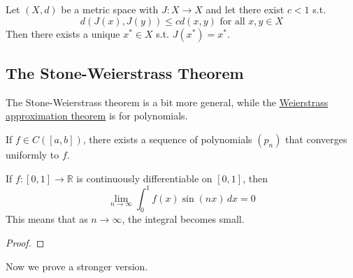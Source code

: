   \begin{theorem}
    \label{thm:contraction-mapping-theorem}
    Let $(X, d)$ be a metric space with $J: X \to X$ and let there exist $c < 1$ s.t.  
    \begin{equation}
      d(J(x), J(y)) \leq c d(x, y) \text{ for all } x, y \in X
    \end{equation}
    Then there exists a unique $x^\ast \in X$ s.t. $J(x^\ast) = x^\ast$. 
  \end{theorem}

\subsection{The Stone-Weierstrass Theorem} 

  The Stone-Weierstrass theorem is a bit more general, while the \hyperref[thm:weierstrass-approximation-theorem]{Weierstrass approximation theorem} is for polynomials. 

  \begin{theorem}
    \label{thm:weierstrass-approximation-theorem}
    If $f \in C([a, b])$, there exists a sequence of polynomials $(p_n)$ that converges uniformly to $f$. 
  \end{theorem}

  \begin{lemma}
    \label{thm:continuously-differentiable-means-integral}
 
    If $f: [0, 1] \to \mathbb{R}$ is continuously differentiable on $[0, 1]$, then 
    \begin{equation}
      \lim_{n \to \infty} \int_0^1 f(x) \sin(nx) \,dx = 0
    \end{equation} 
    This means that as $n \to \infty$, the integral becomes small. 
  \end{lemma}
  \begin{proof}
    
  \end{proof}

  Now we prove a stronger version. 

